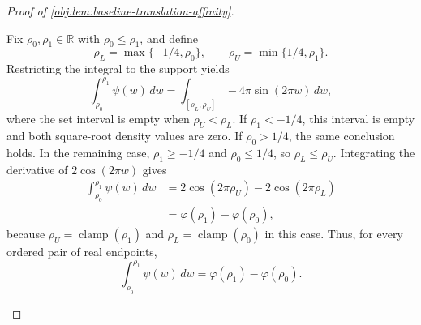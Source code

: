 \begin{proof}[Proof of \cref{obj:lem:baseline-translation-affinity}]
\begin{enumerate}
Fix \(\rho_0,\rho_1\in\mathbb R\) with \(\rho_0\le\rho_1\), and define
\[
\rho_L=\max\{-1/4,\rho_0\},
\qquad
\rho_U=\min\{1/4,\rho_1\}.
\]
Restricting the integral to the support yields
\[
\int_{\rho_0}^{\rho_1}\psi(w)\,dw
=\int_{[\rho_L,\rho_U]}-4\pi\sin(2\pi w)\,dw,
\]
where the set interval is empty when \(\rho_U<\rho_L\).
If \(\rho_1<-1/4\), this interval is empty and both square-root density values are zero. If \(\rho_0>1/4\), the same conclusion holds. In the remaining case,
\(\rho_1\ge-1/4\) and \(\rho_0\le1/4\), so \(\rho_L\le\rho_U\). Integrating the derivative of \(2\cos(2\pi w)\) gives
\[
\begin{aligned}
\int_{\rho_0}^{\rho_1}\psi(w)\,dw
&=2\cos(2\pi\rho_U)-2\cos(2\pi\rho_L)\\
&=\varphi(\rho_1)-\varphi(\rho_0),
\end{aligned}
\]
because \(\rho_U=\operatorname{clamp}(\rho_1)\) and
\(\rho_L=\operatorname{clamp}(\rho_0)\) in this case. Thus, for every ordered pair of real endpoints,
\[
\int_{\rho_0}^{\rho_1}\psi(w)\,dw
=\varphi(\rho_1)-\varphi(\rho_0).
\]


\end{enumerate}
\end{proof}
